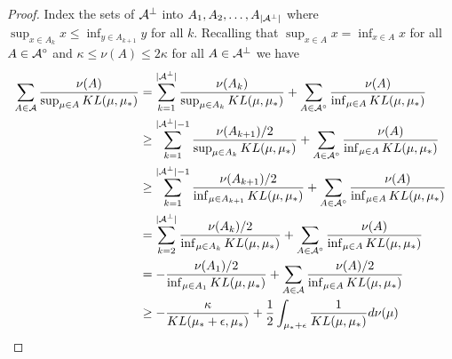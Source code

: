 \begin{proof}
Index the sets of $\mathcal{A}^\perp$ into $A_1,A_2,\dots,A_{|\mathcal{A}^\perp|}$ where $\sup_{x \in A_k} x \leq \inf_{y \in A_{k+1}} y$ for all $k$. 
Recalling that $\sup_{x \in A} x = \inf_{x \in A} x$ for all $A \in \mathcal{A}^\circ$ and $\kappa \leq \nu(A) \leq 2\kappa$ for all $A \in \mathcal{A}^\perp$ we have 
\begin{align*}
\sum_{A \in \mathcal{A}}  \frac{\nu(A)}{\sup_{\mu \in A} KL(\mu,\mu_*)} 
&= \sum_{k = 1}^{|\mathcal{A}^\perp|}  \frac{\nu(A_k)}{\sup_{\mu \in A_k} KL(\mu,\mu_*)} + \sum_{A \in \mathcal{A}^\circ}  \frac{\nu(A)}{\inf_{\mu \in A} KL(\mu,\mu_*)} \\
&\geq \sum_{k = 1}^{|\mathcal{A}^\perp|-1}  \frac{\nu(A_{k+1})/2}{\sup_{\mu \in A_k} KL(\mu,\mu_*)} + \sum_{A \in \mathcal{A}^\circ}  \frac{\nu(A)}{\inf_{\mu \in A} KL(\mu,\mu_*)} \\
&\geq \sum_{k = 1}^{|\mathcal{A}^\perp|-1}  \frac{\nu(A_{k+1})/2}{\inf_{\mu \in A_{k+1}} KL(\mu,\mu_*)} + \sum_{A \in \mathcal{A}^\circ}  \frac{\nu(A)}{\inf_{\mu \in A} KL(\mu,\mu_*)} \\
&=   \sum_{k = 2}^{|\mathcal{A}^\perp|}  \frac{\nu(A_k)/2}{\inf_{\mu \in A_k} KL(\mu,\mu_*)} + \sum_{A \in \mathcal{A}^\circ}  \frac{\nu(A)}{\inf_{\mu \in A} KL(\mu,\mu_*)}\\
&=  -\frac{\nu(A_1)/2}{\inf_{\mu \in A_1} KL(\mu,\mu_*)} + \sum_{A \in \mathcal{A}}  \frac{\nu(A)/2}{\inf_{\mu \in A} KL(\mu,\mu_*)}\\
&\geq   -\frac{\kappa}{KL(\mu_*+\epsilon,\mu_*)}  + \frac{1}{2} \int_{\mu_*+\epsilon} \frac{1}{KL(\mu,\mu_*)} d\nu(\mu) 
 \end{align*}

\end{proof}
